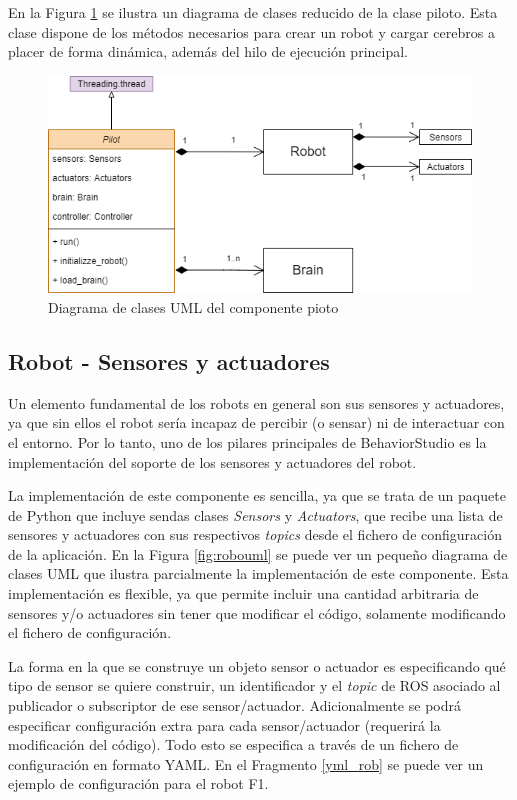 En la Figura \ref{fig:pilotuml} se ilustra un diagrama de clases reducido de la clase piloto. Esta clase dispone de los métodos necesarios para crear un robot y cargar cerebros a placer de forma dinámica, además del hilo de ejecución principal.

\begin{figure}
  \centering
  \includegraphics[width=.6\linewidth]{img/pilotuml}
  \caption{Diagrama de clases UML del componente pioto}
  \label{fig:pilotuml}
\end{figure}

\subsection{Robot - Sensores y actuadores}

Un elemento fundamental de los robots en general son sus sensores y actuadores, ya que sin ellos el robot sería incapaz de percibir (o sensar) ni de interactuar con el entorno. Por lo tanto, uno de los pilares principales de BehaviorStudio es la implementación del soporte de los sensores y actuadores del robot.

La implementación de este componente es sencilla, ya que se trata de un paquete de Python que incluye sendas clases \textit{Sensors} y \textit{Actuators}, que recibe una lista de sensores y actuadores con sus respectivos \textit{topics} desde el fichero de configuración de la aplicación. En la Figura \ref{fig:robouml} se puede ver un pequeño diagrama de clases UML que ilustra parcialmente la implementación de este componente. Esta implementación es flexible, ya que permite incluir una cantidad arbitraria de sensores y/o actuadores sin tener que modificar el código, solamente modificando el fichero de configuración.

La forma en la que se construye un objeto sensor o actuador es especificando qué tipo de sensor se quiere construir, un identificador y el \textit{topic} de ROS asociado al publicador o subscriptor de ese sensor/actuador. Adicionalmente se podrá especificar configuración extra para cada sensor/actuador (requerirá la modificación del código). Todo esto se especifica a través de un fichero de configuración en formato YAML. En el Fragmento \ref{yml_rob} se puede ver un ejemplo de configuración para el robot F1.

